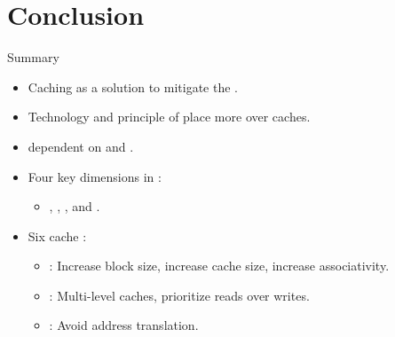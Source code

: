 \section{Conclusion}

\begin{frame}[t]{Summary}
\begin{itemize}

  \item Caching as a solution to mitigate the .

  \item Technology  and principle of 
        place more  over caches.
  
  \item {} dependent on 
        and .

  \item Four key dimensions in :
    \begin{itemize}
      \item 
        , 
        ,
        , and
        .
    \end{itemize}

  \item Six  cache :
    \begin{itemize}
      \item {}: 
        Increase block size,
        increase cache size,
        increase associativity.
      \item {}:
        Multi-level caches, 
        prioritize reads over writes.
      \item {}:
        Avoid address translation.
    \end{itemize}
\end{itemize}
\end{frame}


